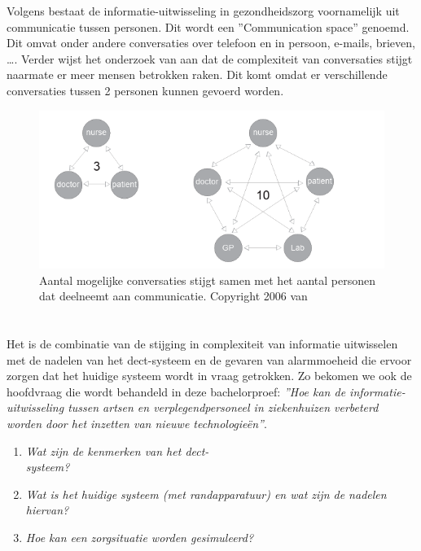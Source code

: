Volgens \textcite{Coiera2006} bestaat de informatie-uitwisseling in gezondheidszorg voornamelijk uit communicatie tussen personen. Dit wordt een ''Communication space'' genoemd. Dit omvat onder andere conversaties over telefoon en in persoon, e-mails, brieven, \ldots . Verder wijst het onderzoek van \textcite{Coiera2006} aan dat de complexiteit van conversaties stijgt naarmate er meer mensen betrokken raken. Dit komt omdat er verschillende conversaties tussen 2 personen kunnen gevoerd worden.

\begin{figure}[h]
  \includegraphics[width=\linewidth]{../graphics/Number-of-conversations.png}
  \caption{Aantal mogelijke conversaties stijgt samen met het aantal personen dat deelneemt aan communicatie. \autocite[Uit ''Communication Systems in Healthcare'' door][The Clinical Biochemist Reviewss, 27(2) , 90.]{Coiera2006} Copyright 2006 van \textcite{Coiera2006}}
  \label{fig:aantal conversaties}
\end{figure}

\section{}%
\label{sec:onderzoeksvraag}

Het is de combinatie van de stijging in complexiteit van informatie uitwisselen met de nadelen van het \gls{dect}-systeem en de gevaren van alarmmoeheid die ervoor zorgen dat het huidige systeem wordt in vraag getrokken. Zo bekomen we ook de hoofdvraag die wordt behandeld in deze bachelorproef: \textit{''Hoe kan de informatie-uitwisseling tussen artsen en verplegendpersoneel in ziekenhuizen verbeterd worden door het inzetten van nieuwe technologieën''}.\\

\begin{enumerate}
  \item \textit{Wat zijn de kenmerken van het \gls{dect}-\\systeem?}
  \item \textit{Wat is het huidige systeem (met randapparatuur) en wat zijn de nadelen hiervan?}
  \item \textit{Hoe kan een zorgsituatie worden gesimuleerd?}
\end{enumerate}


